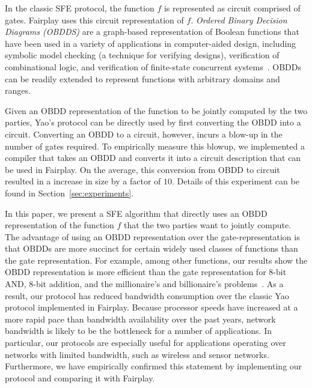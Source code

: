 In the classic SFE protocol, the function $f$ is represented as
circuit comprised of gates. Fairplay uses this circuit
representation of $f$.  {\it Ordered Binary Decision Diagrams (OBDDS)}
are a graph-based representation of Boolean functions that have been
used in a variety of applications in computer-aided design, including
symbolic model checking (a technique for verifying designs),
verification of combinational logic, and verification of finite-state
concurrent systems~\cite{Bryant:BDD,Clarke:book}.  OBDDs can be
readily extended to represent functions with arbitrary domains and
ranges.  

Given an OBDD representation of the function to be jointly computed by
the two parties, Yao's protocol can be directly used by first converting the OBDD into a circuit.
Converting an OBDD to a circuit, however,
incurs a blow-up in the number of gates required. To empirically
measure this blowup, we implemented a compiler that takes an OBDD and
converts it into a circuit description that can be used in Fairplay.
On the average, this conversion from OBDD to circuit resulted in a
increase in size by a factor of $10$. Details of this experiment can
be found in Section~\ref{sec:experiments}.

In this paper, we present a
SFE algorithm that directly uses an OBDD representation of the
function $f$ that the two parties want to jointly compute. The
advantage of using an OBDD representation over the gate-representation
is that OBDDs are more succinct for certain widely used classes of
functions than the gate representation. For example, among other
functions, our results show the OBDD representation is more efficient
than the gate representation for 8-bit AND, 8-bit addition, and the
millionaire's and billionaire's problems~\cite{Yao:86}.  As a result,
our protocol has reduced bandwidth consumption over the classic Yao
protocol implemented in Fairplay. Because processor speeds have
increased at a more rapid pace than bandwidth availability over the
past years, network bandwidth is likely to be the bottleneck for a number of applications. In particular, our
protocols are especially useful for applications operating over
networks with limited bandwidth, such as wireless and sensor networks.
Furthermore, we have empirically confirmed this statement by
implementing our protocol and comparing it with Fairplay.

